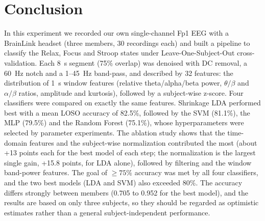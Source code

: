\section{Conclusion}\label{sec:conclusion}

In this experiment we recorded our own single-channel Fp1 EEG with a BrainLink headset (three members, 30 recordings each) and built a pipeline to classify the Relax, Focus and Stroop states under Leave-One-Subject-Out cross-validation. Each 8~s segment (75\% overlap) was denoised with DC removal, a 60~Hz notch and a 1--45~Hz band-pass, and described by 32 features: the distribution of 1~s window features (relative theta/alpha/beta power, $\theta/\beta$ and $\alpha/\beta$ ratios, amplitude and kurtosis), followed by a subject-wise z-score. Four classifiers were compared on exactly the same features. Shrinkage LDA performed best with a mean LOSO accuracy of 82.5\%, followed by the SVM (81.1\%), the MLP (79.5\%) and the Random Forest (75.1\%), whose hyperparameters were selected by parameter experiments. The ablation study shows that the time-domain features and the subject-wise normalization contributed the most (about +13 points each for the best model of each step; the normalization is the largest single gain, +15.8 points, for LDA alone), followed by filtering and the window band-power features. The goal of $\geq 75\%$ accuracy was met by all four classifiers, and the two best models (LDA and SVM) also exceeded 80\%. The accuracy differs strongly between members (0.705 to 0.952 for the best model), and the results are based on only three subjects, so they should be regarded as optimistic estimates rather than a general subject-independent performance.
